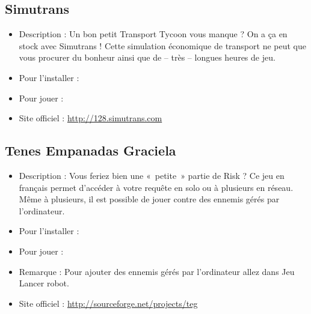 \subsection{Simutrans}
\begin{itemize}
\begingroup
{}
\item Description : Un bon petit Transport Tycoon vous manque ? On a ça en stock avec Simutrans ! Cette simulation économique de transport ne peut que vous procurer du bonheur ainsi que de -- très -- longues heures de jeu.{\par}
\endgroup
\item Pour l'installer : 
\item Pour jouer : 
\item Site officiel : \url{http://128.simutrans.com}{\par}
\end{itemize}
\subsection{Tenes Empanadas Graciela}
\begin{itemize}
\begingroup
{}
\item Description : Vous feriez bien une «~petite~» partie de Risk ? Ce jeu en français permet d'accéder à votre requête en solo ou à plusieurs en réseau. Même à plusieurs, il est possible de jouer contre des ennemis gérés par l'ordinateur.{\par}
\endgroup
\item Pour l'installer : 
\item Pour jouer : 
\item Remarque : Pour ajouter des ennemis gérés par l'ordinateur allez dans Jeu \FlecheDroite Lancer robot.{\par}
\item Site officiel : \url{http://sourceforge.net/projects/teg}{\par}
\end{itemize}
\newpage
